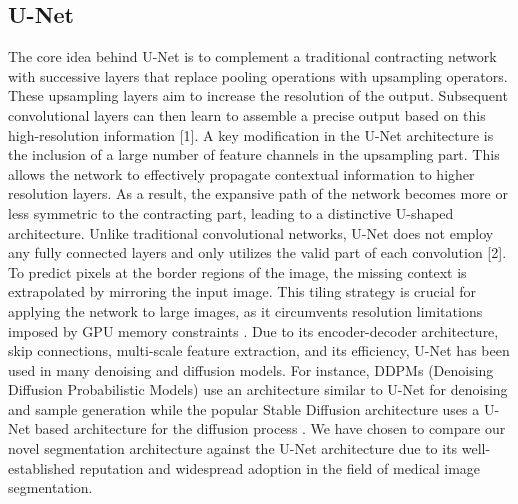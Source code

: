 \documentclass[conference]{IEEEtran}
\begin{document}
\subsection{U-Net}
 The core idea behind U-Net is to complement a traditional contracting network with successive layers that replace pooling operations with upsampling operators. These upsampling layers aim to increase the resolution of the output. Subsequent convolutional layers can then learn to assemble a precise output based on this high-resolution information [1]. 
 A key modification in the U-Net architecture is the inclusion of a large number of feature channels in the upsampling part. This allows the network to effectively propagate contextual information to higher resolution layers. As a result, the expansive path of the network becomes more or less symmetric to the contracting part, leading to a distinctive U-shaped architecture. Unlike traditional convolutional networks, U-Net does not employ any fully connected layers and only utilizes the valid part of each convolution [2]. To predict pixels at the border regions of the image, the missing context is extrapolated by mirroring the input image. This tiling strategy is crucial for applying the network to large images, as it circumvents resolution limitations imposed by GPU memory constraints \cite{ronneberger2015unet}. Due to its encoder-decoder architecture, skip connections, multi-scale feature extraction, and its efficiency, U-Net has been used in many denoising and diffusion models. For instance, DDPMs (Denoising Diffusion Probabilistic Models) use an architecture similar to U-Net for denoising and sample generation \cite{DBLP:journals/corr/abs-2006-11239} while the popular Stable Diffusion architecture uses a U-Net based architecture for the diffusion process \cite{rombach2021highresolution}. We have chosen to compare our novel segmentation architecture against the U-Net architecture due to its well-established reputation and widespread adoption in the field of medical image segmentation.
 
\end{document}
